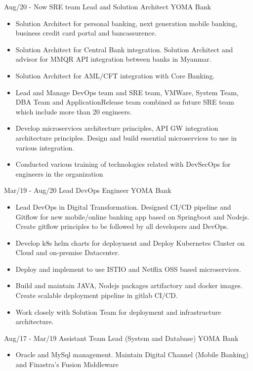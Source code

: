 \documentclass[]{friggeri-cv}
\begin{document}
\begin{entrylist}
  \entry
    {Aug/20 - Now}
    {SRE team Lead and Solution Architect}
    {YOMA Bank}
    { \begin{itemize}
      \item Solution Architect for personal banking, next generation mobile banking, business credit card portal and bancassurence.
      \item Solution Architect for Central Bank integration. Solution Architect and advisor for MMQR API integration between banks in Myanmar.
      \item Solution Architect for AML/CFT integration with Core Banking.
      \item Lead and Manage DevOps team and SRE team, VMWare, System Team, DBA Team and ApplicationRelease team combined as future SRE team which include more than 20 engineers.
      \item Develop microservices architecture principles, API GW integration architecture principles. Design and build essential microservices to use in various integration.
      \item Conducted various training of technologies related with DevSecOps for engineers in the organization
      \end{itemize}
    }
  \entry
    {Mar/19 - Aug/20}
    {Lead DevOps Engineer}
    {YOMA Bank}
    { \begin{itemize}
        \item Lead DevOps in Digital Transformation. Designed CI/CD pipeline and Gitflow for new mobile/online banking app based on Springboot and Nodejs. Create gitflow principles to be followed by all developers and DevOps.
        \item Develop k8s helm charts for deployment and Deploy Kubernetes Cluster on Cloud and on-premise Datacenter.
        \item Deploy and implement to use ISTIO and Netflix OSS based microservices.
        \item Build and maintain JAVA, Nodejs packages artifactory and docker images. Create scalable deployment pipeline in gitlab CI/CD.
        \item Work closely with Solution Team for deployment and infrastructure architecture.
      \end{itemize}
    }
  \entry
    {Aug/17 - Mar/19}
    {Assistant Team Lead (System and Database)}
    {YOMA Bank}
    {
      \begin{itemize}
        \item Oracle and MySql management. Maintain Digital Channel (Mobile Banking) and Finastra's Fusion Middleware

\end{itemize}}
\end{entrylist}
\end{document}
